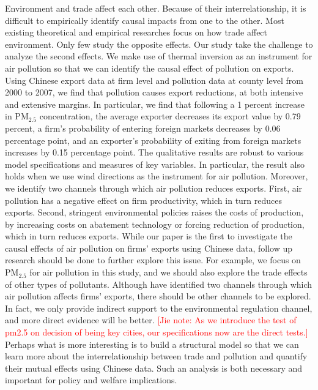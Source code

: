 \documentclass[12pt]{article}
\begin{document}
    Environment and trade affect each other. Because of their interrelationship, it is difficult to empirically identify causal impacts from one to the other. Most existing theoretical and empirical researches focus on how trade affect environment. Only few study the opposite effects. Our study take the challenge to analyze the second effects. We make use of thermal inversion as an instrument for air pollution so that we can identify the causal effect of pollution on exports. Using Chinese export data at firm level and pollution data at county level from 2000 to 2007, we find that pollution causes export reductions, at both intensive and extensive margins. In particular, we find that following a 1 percent increase in $\mathrm{PM_{2.5}}$ concentration, the average exporter decreases its export value by 0.79 percent, a firm's probability of entering foreign markets decreases by 0.06 percentage point, and an exporter's probability of exiting from foreign markets increases by 0.15 percentage point. The qualitative results are robust to various model specifications and measures of key variables. In particular, the result also holds when we use wind directions as the instrument for air pollution. Moreover, we identify two channels through which air pollution reduces exports. First, air pollution has a negative effect on firm productivity, which in turn reduces exports. Second, stringent environmental policies raises the costs of production, by increasing costs on abatement technology or forcing reduction of production, which in turn reduces exports.
    While our paper is the first to investigate the causal effects of air pollution on firms' exports using Chinese data, follow up research should be done to further explore this issue. For example, we focus on $\mathrm{PM_{2.5}}$ for air pollution in this study, and we should also explore the trade effects of other types of pollutants. Although have identified two channels through which air pollution affects firms' exports, there should be other channels to be explored. In fact, we only provide indirect support to the environmental regulation channel, and more direct evidence will be better. \textcolor{red}{[Jie note: As we introduce the test of pm2.5 on decision of being key cities, our specifications now are the direct tests.]} Perhaps what is more interesting is to build a structural model so that we can learn more about the interrelationship between trade and pollution and quantify their mutual effects using Chinese data. Such an analysis is both necessary and important for policy and welfare implications.  
\end{document}
